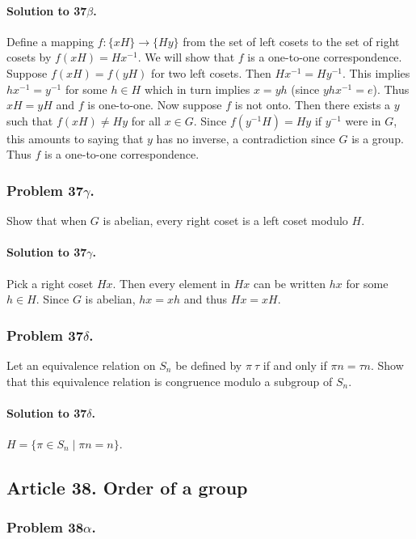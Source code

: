 \paragraph*{Solution to 37$\beta$.}
Define a mapping $f : \{ xH \} \rightarrow \{Hy\}$ from the set of left cosets
to the set of right cosets by $f (xH) = Hx^{-1}$. We will show that $f$ is a
one-to-one correspondence. Suppose $f(xH) = f(yH)$ for two left cosets. Then
$Hx^{-1} = Hy^{-1}$. This implies $hx^{-1} = y^{-1}$ for some $h \in H$ which
in turn implies $x = yh$ (since $yhx^{-1} = e$). Thus $xH = yH$ and $f$ is
one-to-one. Now suppose $f$ is not onto. Then there exists a $y$ such that
$f(xH) \neq Hy$ for all $x \in G$. Since $f(y^{-1}H) = Hy$ if $y^{-1}$ were in $G$,
this amounts to saying that $y$ has no inverse, a contradiction since $G$ is a
group. Thus $f$ is a one-to-one correspondence.

\subsubsection{Problem 37$\gamma$.}
Show that when $G$ is abelian, every right coset is a left coset modulo $H$.

\paragraph*{Solution to 37$\gamma$.}
Pick a right coset $Hx$. Then every element in $Hx$ can be written $hx$ for
some $h \in H$. Since $G$ is abelian, $hx = xh$ and thus $Hx = xH$.

\subsubsection{Problem 37$\delta$.}
Let an equivalence relation on $S_n$ be defined by $\pi ~ \tau$ if and only if
$\pi n = \tau n$. Show that this equivalence relation is congruence modulo a
subgroup of $S_n$.

\paragraph*{Solution to 37$\delta$.}
$H = \{ \pi \in S_n \mid \pi n = n \}$.

\subsection{Article 38. Order of a group}
\subsubsection{Problem 38$\alpha$.}

